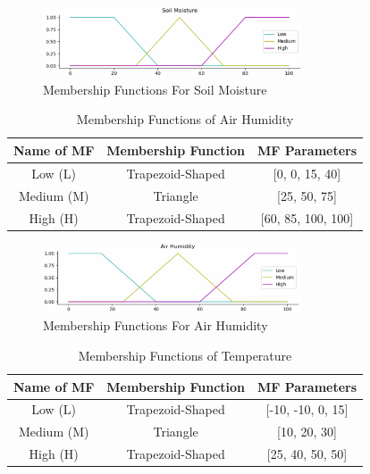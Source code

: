 \documentclass[conference]{IEEEtran}
\begin{document}
\begin{figure}[!ht]
    \centering
     \includegraphics[width=3in]{graphs/moisture.png}
    \caption{Membership Functions For Soil Moisture} 
    \label{figure:moisture}
\end{figure}


 \begin{table}[!ht]
    \caption{Membership Functions of Air Humidity}
    \label{table:humidity_mem}
    \centering
    \begin{tabular}{c c c}
        \hline 
        \bfseries Name of MF & \bfseries Membership Function & \bfseries MF Parameters\\
        \hline  
        Low (L) & Trapezoid-Shaped & [0, 0, 15, 40] \\
        Medium (M) & Triangle & [25, 50, 75]\\
        High (H) & Trapezoid-Shaped & [60, 85, 100, 100]\\
    \hline
    \end{tabular}
\end{table}

\begin{figure}[!ht]
    \centering
     \includegraphics[width=3in]{graphs/humidity.png}
    \caption{Membership Functions For Air Humidity} 
    \label{figure:humidity}
\end{figure}



 \begin{table}[!ht]
    \caption{Membership Functions of Temperature}
    \label{table:temperature_mem}
    \centering
    \begin{tabular}{c c c}
        \hline 
        \bfseries Name of MF & \bfseries Membership Function & \bfseries MF Parameters\\
        \hline  
        Low (L)  & Trapezoid-Shaped & [-10, -10, 0, 15]\\
        Medium (M) & Triangle & [10, 20, 30]\\
        High (H) & Trapezoid-Shaped & [25, 40, 50, 50]\\
    \hline
    \end{tabular}
\end{table}
\end{document}

